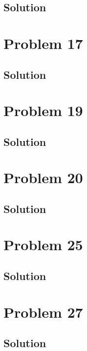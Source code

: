 \documentclass[12pt]{article}
\begin{document}
        \subsection{Solution}

    \pagebreak
    \section{Problem 17}

        \subsection{Solution}

    \pagebreak
    \section{Problem 19}

        \subsection{Solution}

    \pagebreak
    \section{Problem 20}

        \subsection{Solution}

    \pagebreak
    \section{Problem 25}

        \subsection{Solution}

    \pagebreak
    \section{Problem 27}

        \subsection{Solution}

    \pagebreak
\end{document}
